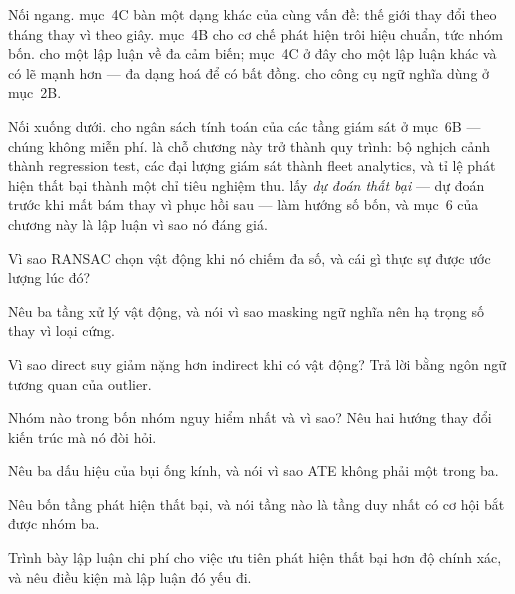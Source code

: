 \documentclass[../../vslam.tex]{subfiles}
\begin{document}
Nối ngang.  mục~4C bàn một dạng khác của cùng vấn đề: thế giới thay đổi theo tháng thay vì theo giây.  mục~4B cho cơ chế phát hiện trôi hiệu chuẩn, tức nhóm bốn.  cho một lập luận về đa cảm biến; mục~4C ở đây cho một lập luận khác và có lẽ mạnh hơn --- đa dạng hoá để có bất đồng.  cho công cụ ngữ nghĩa dùng ở mục~2B.

Nối xuống dưới.  cho ngân sách tính toán của các tầng giám sát ở mục~6B --- chúng không miễn phí.  là chỗ chương này trở thành quy trình: bộ nghịch cảnh thành regression test, các đại lượng giám sát thành fleet analytics, và tỉ lệ phát hiện thất bại thành một chỉ tiêu nghiệm thu.  lấy \emph{dự đoán thất bại} --- dự đoán trước khi mất bám thay vì phục hồi sau --- làm hướng số bốn, và mục~6 của chương này là lập luận vì sao nó đáng giá.

\begin{tukiem}
\item Vì sao RANSAC chọn vật động khi nó chiếm đa số, và cái gì thực sự được ước lượng lúc đó?
\item Nêu ba tầng xử lý vật động, và nói vì sao masking ngữ nghĩa nên hạ trọng số thay vì loại cứng.
\item Vì sao direct suy giảm nặng hơn indirect khi có vật động? Trả lời bằng ngôn ngữ tương quan của outlier.
\item Nhóm nào trong bốn nhóm nguy hiểm nhất và vì sao? Nêu hai hướng thay đổi kiến trúc mà nó đòi hỏi.
\item Nêu ba dấu hiệu của bụi ống kính, và nói vì sao ATE không phải một trong ba.
\item Nêu bốn tầng phát hiện thất bại, và nói tầng nào là tầng duy nhất có cơ hội bắt được nhóm ba.
\item Trình bày lập luận chi phí cho việc ưu tiên phát hiện thất bại hơn độ chính xác, và nêu điều kiện mà lập luận đó yếu đi.
\end{tukiem}
\ifSubfilesClassLoaded{\printbibliography[title={Nguồn}]}{}
\end{document}
